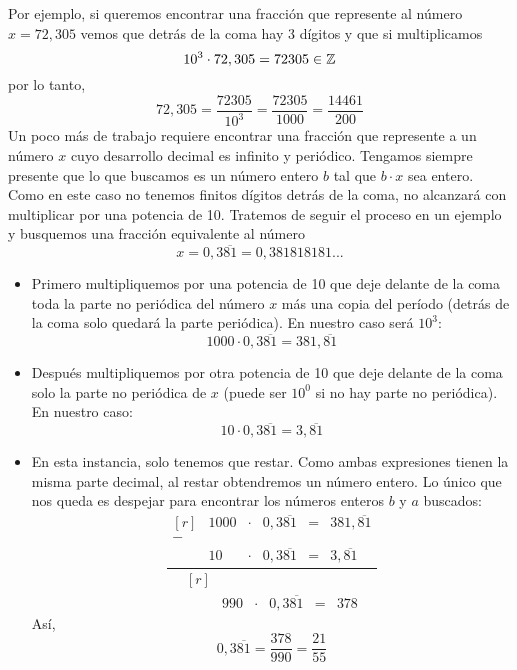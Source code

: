 \documentclass[../Teoría.root.tex]{subfiles}
\begin{document}
Por ejemplo, si queremos encontrar una fracción que represente al número \(x = 72,305\) vemos que detrás de la coma hay 3 dígitos y que si multiplicamos
\[10^3\cdot72,305=72305\in\mathbb{Z}\] por lo tanto, \[72,305=\frac{72305}{10^3}=\frac{72305}{1000}=\frac{14461}{200}\]
Un poco más de trabajo requiere encontrar una fracción que represente a un número \(x\) cuyo desarrollo decimal es infinito y periódico.
Tengamos siempre presente que lo que buscamos es un número entero \(b\) tal que \(b \cdot x\) sea entero.
Como en este caso no tenemos finitos dígitos detrás de la coma, no alcanzará con multiplicar por una potencia de 10.
Tratemos de seguir el proceso en un ejemplo y busquemos una fracción equivalente al número \[x=0,3\overline{81}=0,381818181...\]
\begin{itemize}
    \item Primero multipliquemos por una potencia de 10 que deje delante de la coma toda la parte no periódica del número \(x\) más una copia del período (detrás de la coma solo quedará la parte periódica).
          En nuestro caso será \(10^3\):\[1000\cdot0,3\overline{81}=381,\overline{81}\]
    \item Después multipliquemos por otra potencia de 10 que deje delante de la coma solo la parte no periódica de \(x\) (puede ser \(10^0\) si no hay parte no periódica).
          En nuestro caso:\[10\cdot0,3\overline{81}=3,\overline{81}\]
    \item En esta instancia, solo tenemos que restar.
          Como ambas expresiones tienen la misma parte decimal, al restar obtendremos un número entero.
          Lo único que nos queda es despejar para encontrar los números enteros \(b\) y \(a\) buscados:
          {
          \def\arraystretch{1}
          \[\frac{
                  \begin{matrix*}[r]
                      & 1000 & \cdot & 0,3\overline{81} & = & 381,\overline{81}\\
                      -\\
                      & 10 & \cdot & 0,3\overline{81} & = & 3,\overline{81}
                  \end{matrix*}
              }{
                  \begin{matrix*}[r]
                      \\
                      & 990 & \cdot & 0,3\overline{81} & = & 378
                  \end{matrix*}
              }\]
          }
          Así, \[0,3\overline{81}=\frac{378}{990}=\frac{21}{55}\]
\end{itemize}
\end{document}
